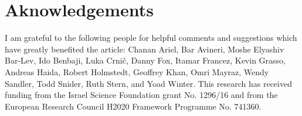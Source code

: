 \documentclass[output=paper]{langsci/langscibook}
\begin{document}
\section*{Aknowledgements}
I am grateful to the following people for helpful comments and suggestions which have greatly benefited the article: Chanan Ariel, Bar Avineri, \linebreak Moshe Elyashiv Bar-Lev, Ido Benbaji, Luka Crnič, Danny Fox, Itamar Francez, Kevin Grasso, Andreas Haida, Robert Holmstedt, Geoffrey Khan, Omri Mayraz, Wendy Sandler, Todd Snider, Ruth Stern, and Yoad Winter. This research has received funding from the Israel Science Foundation grant No. 1296/16  and from the European Research Council H2020 Framework Programme No. 741360.

{\sloppy\printbibliography[heading=subbibliography,notkeyword=this]}
\end{document}

